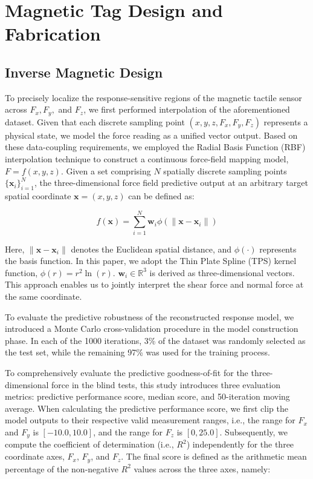 \section{Magnetic Tag Design and Fabrication}
\label{sec:design}
\subsection{Inverse Magnetic Design}
\label{sec:design1}
To precisely localize the response-sensitive regions of the magnetic tactile sensor across $F_x, F_y,$ and $F_z$, we first performed interpolation of the aforementioned dataset.
Given that each discrete sampling point $(x, y, z, F_x, F_y, F_z)$ represents a physical state, we model the force reading as a unified vector output.
Based on these data-coupling requirements, we employed the Radial Basis Function (RBF) interpolation technique to construct a continuous force-field mapping model, $F = f(x, y, z)$. 
Given a set comprising $N$ spatially discrete sampling points $\{\mathbf{x}_i\}_{i=1}^N$, the three-dimensional force field predictive output at an arbitrary target spatial coordinate $\mathbf{x} = (x, y, z)$ can be defined as:

\begin{equation}
f(\mathbf{x}) = \sum_{i=1}^{N} \mathbf{w}_i \phi(\|\mathbf{x} - \mathbf{x}_i\|)    
\end{equation}

Here, $\|\mathbf{x} - \mathbf{x}_i\|$ denotes the Euclidean spatial distance, and $\phi(\cdot)$ represents the basis function.
In this paper, we adopt the Thin Plate Spline (TPS) kernel function, $\phi(r) = r^2 \ln(r)$. $\mathbf{w}_i \in \mathbb{R}^3$ is derived as three-dimensional vectors.
This approach enables us to jointly interpret the shear force and normal force at the same coordinate.

To evaluate the predictive robustness of the reconstructed response model, we introduced a Monte Carlo cross-validation procedure in the model construction phase.
In each of the 1000 iterations, 3\% of the dataset was randomly selected as the test set, while the remaining 97\% was used for the training process.

To comprehensively evaluate the predictive goodness-of-fit for the three-dimensional force in the blind tests, this study introduces three evaluation metrics: predictive performance score, median score, and 50-iteration moving average. 
When calculating the predictive performance score, we first clip the model outputs to their respective valid measurement ranges, i.e., the range for $F_x$ and $F_y$ is $[-10.0, 10.0]$, and the range for $F_z$ is $[0, 25.0]$. 
Subsequently, we compute the coefficient of determination (i.e., $R^2$) independently for the three coordinate axes, $F_x$, $F_y$, and $F_z$. 
The final score is defined as the arithmetic mean percentage of the non-negative $R^2$ values across the three axes, namely:

